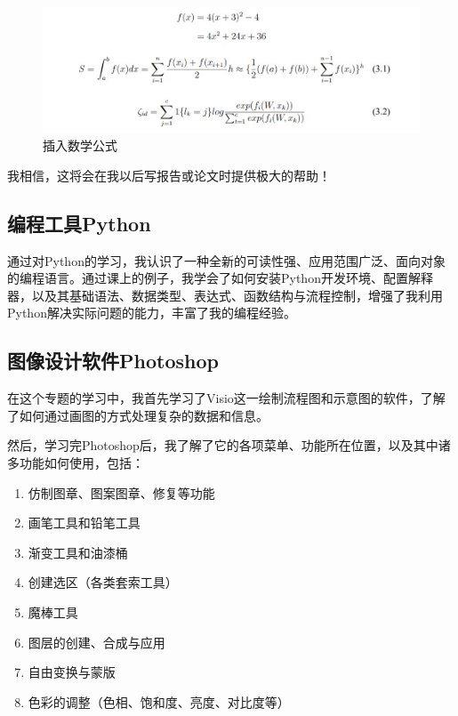 \documentclass[supercite]{Experimental_Report}
\theoremstyle{definition}
\begin{document}
    \begin{figure}[htb]
    	\begin{center}
    		\includegraphics[scale=0.8]{images/4-2.jpg}
    		\caption{插入数学公式}
    		\label{fig4-2}
    	\end{center}
    \end{figure}
	
	我相信，这将会在我以后写报告或论文时提供极大的帮助！
	
	\subsection{编程工具Python}
	
	通过对Python的学习，我认识了一种全新的可读性强、应用范围广泛、面向对象的编程语言。通过课上的例子，我学会了如何安装Python开发环境、配置解释器，以及其基础语法、数据类型、表达式、函数结构与流程控制，增强了我利用Python解决实际问题的能力，丰富了我的编程经验。
	
	\subsection{图像设计软件Photoshop}
	
	在这个专题的学习中，我首先学习了Visio这一绘制流程图和示意图的软件，了解了如何通过画图的方式处理复杂的数据和信息。
	
	然后，学习完Photoshop后，我了解了它的各项菜单、功能所在位置，以及其中诸多功能如何使用，包括：
	
	\begin{enumerate}
		\renewcommand{\labelenumi}{\theenumi)}
		\item 仿制图章、图案图章、修复等功能
		\item 画笔工具和铅笔工具
		\item 渐变工具和油漆桶
		\item 创建选区（各类套索工具）
		\item 魔棒工具
		\item 图层的创建、合成与应用
		\item 自由变换与蒙版
		\item 色彩的调整（色相、饱和度、亮度、对比度等）
	\end{enumerate}	
\end{document}
